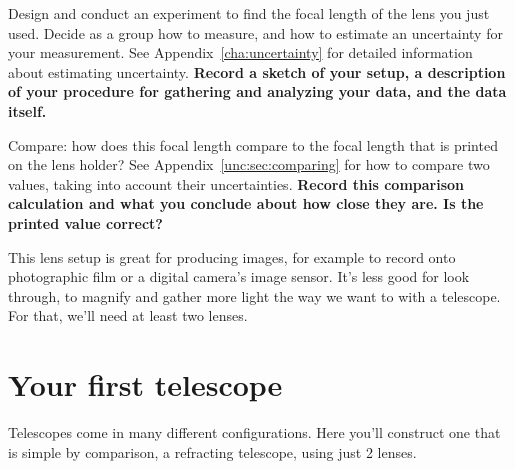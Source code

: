 \begin{steps}
	\item Design and conduct an experiment to find the focal length of the lens you just used. Decide as a group how to measure, and how to estimate an uncertainty for your measurement. See Appendix\ \ref{cha:uncertainty} for detailed information about estimating uncertainty. \textbf{Record a sketch of your setup, a description of your procedure for gathering and analyzing your data, and the data itself.}
	
	\item Compare: how does this focal length compare to the focal length that is printed on the lens holder? See Appendix\ \ref{unc:sec:comparing} for how to compare two values, taking into account their uncertainties. \textbf{Record this comparison calculation and what you conclude about how close they are. Is the printed value correct?}
\end{steps}

This lens setup is great for producing images, for example to record onto photographic film or a digital camera's image sensor. It's less good for look through, to magnify and gather more light the way we want to with a telescope. For that, we'll need at least two lenses.

\section{Your first telescope}

Telescopes come in many different configurations. Here you'll construct one that is simple by comparison, a refracting telescope, using just 2 lenses.

